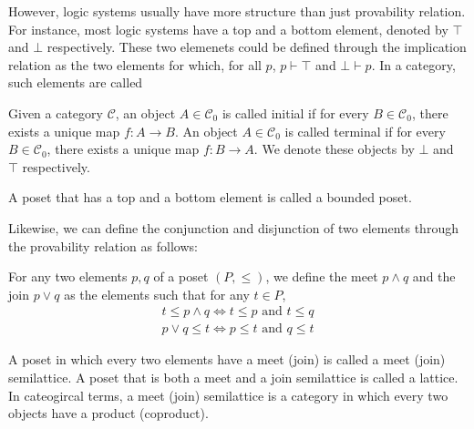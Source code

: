 However, logic systems usually have more structure than just provability relation.
For instance, most logic systems have a top and a bottom element, 
denoted by $\top$ and $\bot$ respectively.
These two elemenets could be defined through the implication relation as
the two elements for which, for all $p$, $p\vdash \top$ and $\bot\vdash p$.
In a category, such elements are called
\begin{definition}
    Given a category $\mathcal{C}$, an object $A\in\mathcal{C}_0$ is called initial if for every $B\in\mathcal{C}_0$,
    there exists a unique map $f:A\to B$.
    An object $A\in\mathcal{C}_0$ is called terminal if for every $B\in\mathcal{C}_0$,
    there exists a unique map $f:B\to A$.
    We denote these objects by $\bot$ and $\top$ respectively.
\end{definition}
A poset that has a top and a bottom element is called a bounded poset.

Likewise, we can define the conjunction and disjunction of two elements
through the provability relation as follows:
\begin{definition}
    For any two elements $p,q$ of a poset $(P,\leq)$, we define
    the meet $p\wedge q$ and the join $p\vee q$ as the elements such that for any $t\in P$,
    \begin{gather*}
        t\leq p\wedge q \iff t\leq p\text{ and }t\leq q\\
        p\vee q\leq t \iff p\leq t\text{ and }q\leq t
    \end{gather*}
\end{definition}
A poset in which every two elements have a meet (join) is called a meet (join) semilattice.
A poset that is both a meet and a join semilattice is called a lattice.
In cateogircal terms, a meet (join) semilattice is a category in which every two objects have a product (coproduct).

